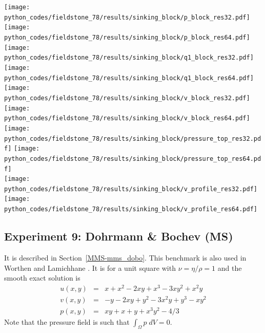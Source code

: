 \begin{center}
\texttt{[image: python\_codes/fieldstone\_78/results/sinking\_block/p\_block\_res32.pdf]}
\texttt{[image: python\_codes/fieldstone\_78/results/sinking\_block/p\_block\_res64.pdf]}\\
\texttt{[image: python\_codes/fieldstone\_78/results/sinking\_block/q1\_block\_res32.pdf]}
\texttt{[image: python\_codes/fieldstone\_78/results/sinking\_block/q1\_block\_res64.pdf]}\\
\texttt{[image: python\_codes/fieldstone\_78/results/sinking\_block/v\_block\_res32.pdf]}
\texttt{[image: python\_codes/fieldstone\_78/results/sinking\_block/v\_block\_res64.pdf]}\\
\texttt{[image: python\_codes/fieldstone\_78/results/sinking\_block/pressure\_top\_res32.pdf]}
\texttt{[image: python\_codes/fieldstone\_78/results/sinking\_block/pressure\_top\_res64.pdf]}\\
\texttt{[image: python\_codes/fieldstone\_78/results/sinking\_block/v\_profile\_res32.pdf]}
\texttt{[image: python\_codes/fieldstone\_78/results/sinking\_block/v\_profile\_res64.pdf]}
\end{center}













\newpage
\subsection*{Experiment 9: Dohrmann \& Bochev (MS)}

It is described in Section~\ref{MMS-mms_dobo}. 
This benchmark is also used in Worthen \etal \cite{wosp14} and Lamichhane \etal \cite{lami17}.
It is for a unit square with $\nu=\eta/\rho=1$ and the smooth exact solution is
\begin{eqnarray}
u(x,y) &=& x+x^2 - 2xy+x^3 - 3xy^2 + x^2y \\
v(x,y) &=& -y-2xy+y^2 -3x^2y + y^3 - xy^2 \\
p(x,y) &=& xy+x+y+x^3y^2 - 4/3
\end{eqnarray}
Note that the pressure field is such that $\int_{\Omega} p \; dV = 0$.


